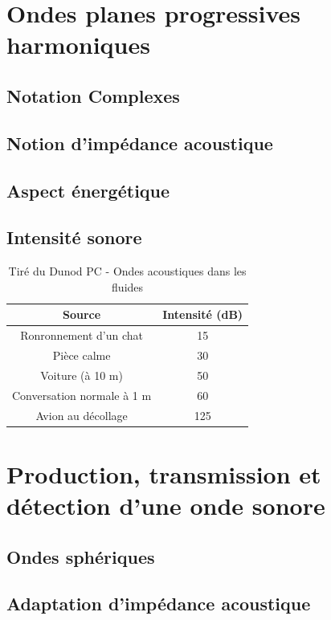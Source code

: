 \documentclass[10pt]{beamer}
\begin{document}
\section{Ondes planes progressives harmoniques}

\subsection{Notation Complexes}
\subsection{Notion d'impédance acoustique}
\subsection{Aspect énergétique}
\subsection{Intensité sonore}

\begin{frame}{\insertsubsection}
    \begin{table}
        \begin{tabular}{|c|c|}\hline
            Source & Intensité (dB) \\ \hline
            Ronronnement d'un chat & 15 \\
            Pièce calme & 30 \\
            Voiture (à 10 m) & 50 \\
            Conversation normale à 1 m & 60 \\
           Avion au décollage & 125 \\ \hline
        \end{tabular}
        \caption{Tiré du Dunod PC - Ondes acoustiques dans les fluides}
    \end{table}
\end{frame}
\section{Production, transmission et détection d'une onde sonore}
\subsection{Ondes sphériques}
\subsection{Adaptation d'impédance acoustique}
\end{document}

